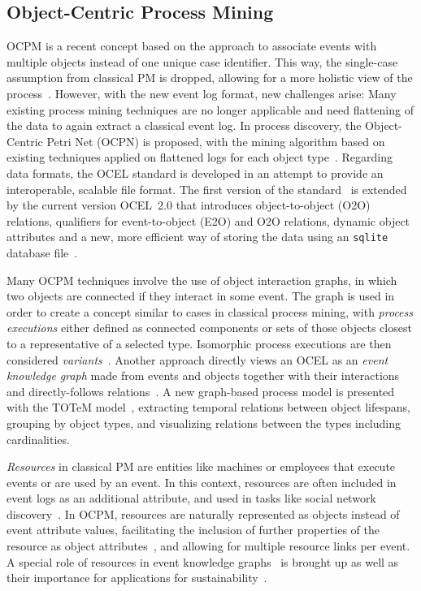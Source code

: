 \subsection*{Object-Centric Process Mining}
\label{sec:rw-ocpm}

OCPM is a recent concept based on the approach to associate events with multiple objects instead of one unique case identifier. This way, the single-case assumption from classical PM is dropped, allowing for a more holistic view of the process~\cite{vanderAalst19object}.
%
However, with the new event log format, new challenges arise:
Many existing process mining techniques are no longer applicable and need flattening of the data to again extract a classical event log.
%
In process discovery, the Object-Centric Petri Net (OCPN) is proposed, with the mining algorithm based on existing techniques applied on flattened logs for each object type~\cite{vanderAalst20OCPNs}.
%
Regarding data formats, the OCEL standard is developed in an attempt to provide an interoperable, scalable file format.
The first version of the standard~\cite{OCEL1} is extended by the current version OCEL~2.0 that introduces object-to-object (O2O) relations, qualifiers for event-to-object (E2O) and O2O relations, dynamic object attributes and a new, more efficient way of storing the data using an \texttt{sqlite} database file~\cite{OCEL2}.

Many OCPM techniques involve the use of object interaction graphs, in which two objects are connected if they interact in some event.
%
The graph is used in order to create a concept similar to cases in classical process mining, with \textit{process executions} either defined as connected components or sets of those objects closest to a representative of a selected type. Isomorphic process executions are then considered \textit{variants}~\cite{Adams22defining}.
%
Another approach directly views an OCEL as an \textit{event knowledge graph} made from events and objects together with their interactions and directly-follows relations~\cite{Fahland22process}.
%
A new graph-based process model is presented with the TOTeM model~\cite{Liss24totem}, extracting temporal relations between object lifespans, grouping by object types, and visualizing relations between the types including cardinalities.


\textit{Resources} in classical PM are entities like machines or employees that execute events or are used by an event. In this context, resources are often included in event logs as an additional attribute, and used in tasks like social network discovery~\cite{vanderAalst16process}.
In OCPM, resources are naturally represented as objects instead of event attribute values, facilitating the inclusion of further properties of the resource as object attributes~\cite{Graves23rethink}, and allowing for multiple resource links per event.
A special role of resources in event knowledge graphs~\cite{Fahland22process} is brought up as well as their importance for applications for sustainability~\cite{Graves23rethink}.

